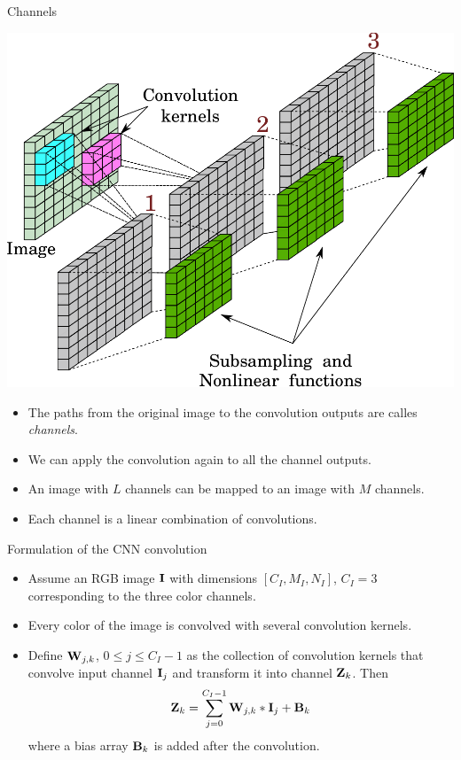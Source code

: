 \documentclass{beamer}
\begin{document}
\begin{frame}{Channels}

\begin{multicols}{2}
\begin{center}
    \includegraphics[scale=0.3]{Module 4 (CNN)/pics/f5.4.pdf}
\end{center}
\columnbreak

\begin{itemize}
\item The paths from the original image to the convolution outputs are calles \emph{channels}. 

\item We can apply the convolution again to all the channel outputs. 

\item An image with $L$ channels  can be mapped to an image with $M$ channels.  
\item Each channel is a linear combination of convolutions. 
\end{itemize}  
\end{multicols}
\end{frame}

\begin{frame}{Formulation of the CNN convolution}
\begin{itemize}
    \item Assume an RGB image ${\bf I}$ with dimensions $[C_I, M_I, N_I]$, $C_I=3$ corresponding to the three color channels.
    \item Every color of the image is convolved with several convolution kernels. 
    \item Define ${\bf W}_{j,k}$, $0\leq j \leq C_I-1$ as the collection of convolution kernels that convolve input channel ${\bf I}_j$ and transform it into  channel ${\bf Z}_k$. Then 
    \begin{equation}
    {\bf Z}_k = \sum_{j=0}^{C_I-1} {\bf W}_{j,k} * {\bf I}_j + {\bf B}_k 
\end{equation}
where a bias array ${\bf B}_k$ is added after the convolution.
\end{itemize}
\end{frame}
\end{document}
